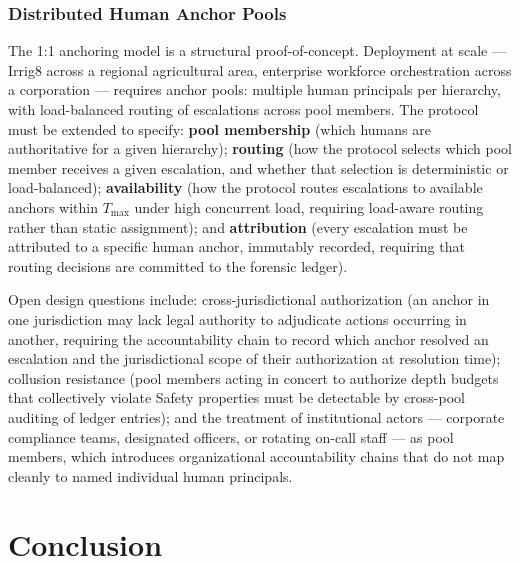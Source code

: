 \subsubsection{Distributed Human Anchor Pools}
\label{sec:future-anchor-pools}

The 1:1 anchoring model is a structural proof-of-concept. Deployment at scale --- Irrig8 across a regional agricultural area, enterprise workforce orchestration across a corporation --- requires anchor pools: multiple human principals per hierarchy, with load-balanced routing of escalations across pool members. The protocol must be extended to specify: \textbf{pool membership} (which humans are authoritative for a given hierarchy); \textbf{routing} (how the protocol selects which pool member receives a given escalation, and whether that selection is deterministic or load-balanced); \textbf{availability} (how the protocol routes escalations to available anchors within $T_{\max}$ under high concurrent load, requiring load-aware routing rather than static assignment); and \textbf{attribution} (every escalation must be attributed to a specific human anchor, immutably recorded, requiring that routing decisions are committed to the forensic ledger).

Open design questions include: cross-jurisdictional authorization (an anchor in one jurisdiction may lack legal authority to adjudicate actions occurring in another, requiring the accountability chain to record which anchor resolved an escalation and the jurisdictional scope of their authorization at resolution time); collusion resistance (pool members acting in concert to authorize depth budgets that collectively violate Safety properties must be detectable by cross-pool auditing of ledger entries); and the treatment of institutional actors --- corporate compliance teams, designated officers, or rotating on-call staff --- as pool members, which introduces organizational accountability chains that do not map cleanly to named individual human principals.

\section{Conclusion}
\label{sec:conclusion}

